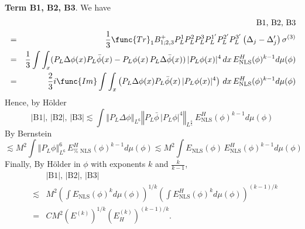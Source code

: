 \documentclass[12pt,letterpaper,leqno]{amsart}
\theoremstyle{plain}
\numberwithin{equation}{section}
\numberwithin{theorem}{section}
\numberwithin{proposition}{section}
\numberwithin{lemma}{section}
\numberwithin{corollary}{section}
\begin{document}
\noindent \textbf{Term B1, B2, B3}. We have 
\begin{eqnarray*}
&&\text{B1, B2, B3} \\
&=&\frac{1}{3}\func{Tr}%
_{1}B_{1;2,3}^{+}P_{L}^{1}P_{L}^{2}P_{L}^{3}P_{L}^{1^{\prime
}}P_{L}^{2^{\prime }}P_{L}^{3^{\prime }}\left( \Delta _{j}-\Delta
_{j}^{\prime }\right) \sigma ^{(3)} \\
&=&\frac{1}{3}\int \int_{x}(P_{L}\Delta \phi (x)P_{L}\bar{\phi}(x)-P_{L}\phi
(x)\,P_{L}\Delta \bar{\phi}(x))\,|P_{L}\phi (x)|^{4}\,dx\,E_{\text{NLS}%
}^{H}(\phi )^{k-1}d\mu (\phi ) \\
&=&\frac{2}{3}i\func{Im}\int \int_{x}\left( P_{L}\Delta \phi (x)P_{L}\bar{%
\phi}(x)\,|P_{L}\phi (x)|^{4}\right) \,dx\,E_{\text{NLS}}^{H}(\phi
)^{k-1}d\mu (\phi )
\end{eqnarray*}%
Hence, by H\"{o}lder%
\begin{equation*}
\left\vert \text{B1}\right\vert \text{, }\left\vert \text{B2}\right\vert 
\text{, }\left\vert \text{B3}\right\vert \lesssim \int \left\Vert
P_{L}\Delta \phi \right\Vert _{L^{6}}\left\Vert P_{L}\bar{\phi}\,|P_{L}\phi
|^{4}\right\Vert _{L^{\frac{6}{5}}}\,E_{\text{NLS}}^{H}(\phi )^{k-1}d\mu
(\phi )
\end{equation*}%
By Bernstein%
\begin{equation*}
\lesssim M^{2}\int \left\Vert P_{L}\phi \right\Vert _{L^{6}}^{6}\,E_{\text{%
NLS}}^{H}(\phi )^{k-1}d\mu (\phi )\lesssim M^{2}\int E_{\text{NLS}}(\phi
)\,E_{\text{NLS}}^{H}(\phi )^{k-1}d\mu (\phi )
\end{equation*}%
Finally, By H\"{o}lder in $\phi $ with exponents $k$ and $\frac{k}{k-1}$,%
\begin{eqnarray*}
&&\left\vert \text{B1}\right\vert \text{, }\left\vert \text{B2}\right\vert 
\text{, }\left\vert \text{B3}\right\vert \\
&\lesssim &M^{2}\left( \int E_{\text{NLS}}(\phi )^{k}d\mu (\phi )\right)
^{1/k}\left( \int E_{\text{NLS}}^{H}(\phi )^{k}d\mu (\phi )\right) ^{(k-1)/k}
\\
&=&CM^{2}(E^{(k)})^{1/k}(E_{H}^{(k)})^{(k-1)/k}.
\end{eqnarray*}
\end{document}
